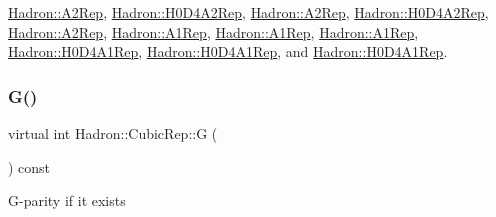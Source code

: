 \mbox{\hyperlink{structHadron_1_1A2Rep_a6c2da481eeb98634c640e8f17a569eea}{Hadron\+::\+A2\+Rep}}, \mbox{\hyperlink{structHadron_1_1H0D4A2Rep_a637522dc6caee2869b2bb632a4c5a5b5}{Hadron\+::\+H0\+D4\+A2\+Rep}}, \mbox{\hyperlink{structHadron_1_1A2Rep_a6c2da481eeb98634c640e8f17a569eea}{Hadron\+::\+A2\+Rep}}, \mbox{\hyperlink{structHadron_1_1H0D4A2Rep_a637522dc6caee2869b2bb632a4c5a5b5}{Hadron\+::\+H0\+D4\+A2\+Rep}}, \mbox{\hyperlink{structHadron_1_1A2Rep_a6c2da481eeb98634c640e8f17a569eea}{Hadron\+::\+A2\+Rep}}, \mbox{\hyperlink{structHadron_1_1A1Rep_a0d1f85837b8f29f9e51656b8bf2abfed}{Hadron\+::\+A1\+Rep}}, \mbox{\hyperlink{structHadron_1_1A1Rep_a0d1f85837b8f29f9e51656b8bf2abfed}{Hadron\+::\+A1\+Rep}}, \mbox{\hyperlink{structHadron_1_1A1Rep_a0d1f85837b8f29f9e51656b8bf2abfed}{Hadron\+::\+A1\+Rep}}, \mbox{\hyperlink{structHadron_1_1H0D4A1Rep_ab13ff026da1bc59df4b52835038296d5}{Hadron\+::\+H0\+D4\+A1\+Rep}}, \mbox{\hyperlink{structHadron_1_1H0D4A1Rep_ab13ff026da1bc59df4b52835038296d5}{Hadron\+::\+H0\+D4\+A1\+Rep}}, and \mbox{\hyperlink{structHadron_1_1H0D4A1Rep_ab13ff026da1bc59df4b52835038296d5}{Hadron\+::\+H0\+D4\+A1\+Rep}}.

\mbox{\label{structHadron_1_1CubicRep_a52104e43266d1614c00bbd1c3b395458}} 
\subsubsection{\texorpdfstring{G()}{G()}\hspace{0.1cm}{\footnotesize\ttfamily [2/3]}}
{\footnotesize\ttfamily virtual int Hadron\+::\+Cubic\+Rep\+::G (\begin{DoxyParamCaption}{ }\end{DoxyParamCaption}) const\hspace{0.3cm}{\ttfamily [pure virtual]}}

G-\/parity if it exists 

